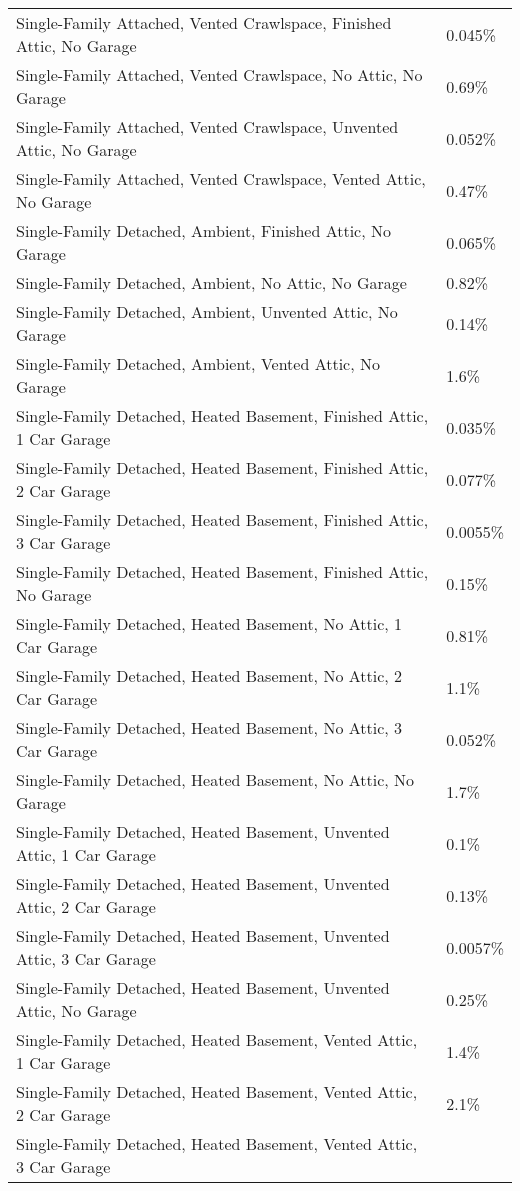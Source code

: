 \begin{longtable}[]{@{}ll@{}}
Single-Family Attached, Vented Crawlspace, Finished Attic, No Garage &
0.045\% \\
Single-Family Attached, Vented Crawlspace, No Attic, No Garage &
0.69\% \\
Single-Family Attached, Vented Crawlspace, Unvented Attic, No Garage &
0.052\% \\
Single-Family Attached, Vented Crawlspace, Vented Attic, No Garage &
0.47\% \\
Single-Family Detached, Ambient, Finished Attic, No Garage & 0.065\% \\
Single-Family Detached, Ambient, No Attic, No Garage & 0.82\% \\
Single-Family Detached, Ambient, Unvented Attic, No Garage & 0.14\% \\
Single-Family Detached, Ambient, Vented Attic, No Garage & 1.6\% \\
Single-Family Detached, Heated Basement, Finished Attic, 1 Car Garage &
0.035\% \\
Single-Family Detached, Heated Basement, Finished Attic, 2 Car Garage &
0.077\% \\
Single-Family Detached, Heated Basement, Finished Attic, 3 Car Garage &
0.0055\% \\
Single-Family Detached, Heated Basement, Finished Attic, No Garage &
0.15\% \\
Single-Family Detached, Heated Basement, No Attic, 1 Car Garage &
0.81\% \\
Single-Family Detached, Heated Basement, No Attic, 2 Car Garage &
1.1\% \\
Single-Family Detached, Heated Basement, No Attic, 3 Car Garage &
0.052\% \\
Single-Family Detached, Heated Basement, No Attic, No Garage & 1.7\% \\
Single-Family Detached, Heated Basement, Unvented Attic, 1 Car Garage &
0.1\% \\
Single-Family Detached, Heated Basement, Unvented Attic, 2 Car Garage &
0.13\% \\
Single-Family Detached, Heated Basement, Unvented Attic, 3 Car Garage &
0.0057\% \\
Single-Family Detached, Heated Basement, Unvented Attic, No Garage &
0.25\% \\
Single-Family Detached, Heated Basement, Vented Attic, 1 Car Garage &
1.4\% \\
Single-Family Detached, Heated Basement, Vented Attic, 2 Car Garage &
2.1\% \\
Single-Family Detached, Heated Basement, Vented Attic, 3 Car Garage &

\end{longtable}
